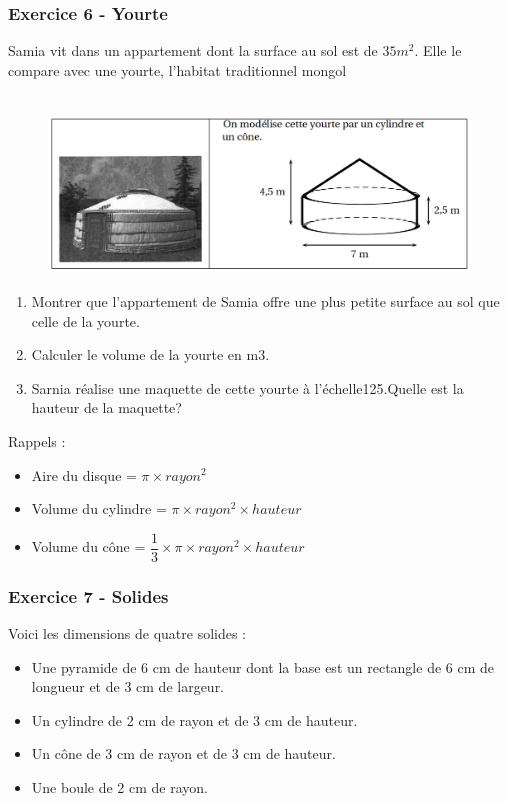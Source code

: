 \documentclass[11pt]{article}
\begin{document}
\subsubsection*{Exercice 6 - Yourte}

Samia vit dans un appartement dont la surface au sol est de $35 m^2$. Elle le compare avec une yourte, l’habitat traditionnel mongol

\begin{figure}[H]
      \centering
      \includegraphics[width=0.8\linewidth]{3x3-volumes-1/sources/yourte.png}
\end{figure}

\begin{enumerate}
\item Montrer que l’appartement de Samia offre une plus petite surface au sol que celle de la yourte.
\item Calculer le volume de la yourte en m3.
\item Sarnia réalise une maquette de cette yourte à l’échelle125.Quelle est la hauteur de la maquette?
\end{enumerate}
  
Rappels : 

\begin{itemize}
  \item Aire du disque = $\pi \times rayon^2$
  \item Volume du cylindre = $\pi \times rayon^2 \times hauteur$
  \item Volume du cône = $\dfrac{1}{3} \times \pi \times rayon^2 \times hauteur$
\end{itemize}

\newpage

\subsubsection*{Exercice 7 - Solides}

Voici les dimensions de quatre solides :

\begin{itemize}
\item Une pyramide de 6 cm de hauteur dont la base est un rectangle de 6 cm de longueur et de 3 cm de largeur.
\item Un cylindre de 2 cm de rayon et de 3 cm de hauteur.
\item Un cône de 3 cm de rayon et de 3 cm de hauteur.
\item Une boule de 2 cm de rayon.
\end{itemize}
\end{document}
